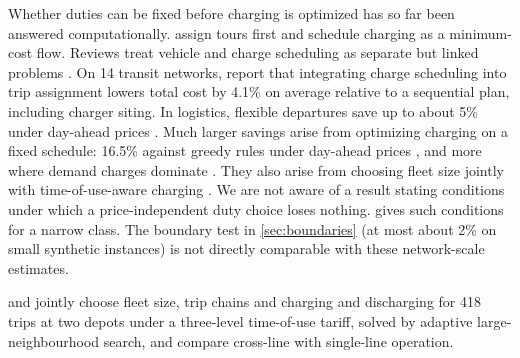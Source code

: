 Whether duties can be fixed before charging is optimized has so far been
answered computationally. \citet{sassiOulamara2017} assign tours first and
schedule charging as a minimum-cost flow. Reviews treat vehicle and charge
scheduling as separate but linked problems \citep{perumal2022review}.
On 14 transit networks, \citet{nath2024joint} report that integrating
charge scheduling into trip assignment lowers total cost by 4.1\% on average
relative to a sequential plan, including charger siting. In logistics,
flexible departures save up to about 5\% under day-ahead prices
\citep{kleinSchiffer2023flexible}. Much larger savings arise from optimizing
charging on a fixed schedule: 16.5\% against greedy rules under day-ahead
prices \citep{abdelwahed2020opportunity}, and more where demand charges
dominate \citep{heLiuSong2020}. They also arise from choosing fleet size
jointly with time-of-use-aware charging \citep{wu2022grid,zhang2024tou}.
We are not aware of a result stating conditions under which a
price-independent duty choice loses nothing.  gives
such conditions for a narrow class. The boundary test in
\cref{sec:boundaries} (at most about 2\% on small synthetic instances) is
not directly comparable with these network-scale estimates.

and \citet{zhou2025v2g} jointly choose fleet size, trip chains and
charging and discharging for 418 trips at two depots under a three-level
time-of-use tariff, solved by adaptive large-neighbourhood search, and
compare cross-line with single-line operation.
